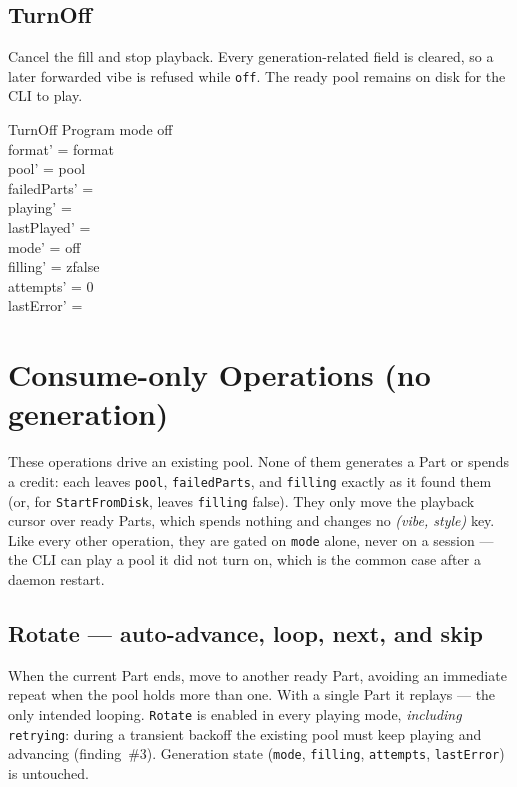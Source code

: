 \documentclass[a4paper,10pt,fleqn]{article}
\begin{document}
\subsection{TurnOff}

Cancel the fill and stop playback. Every generation-related field is cleared,
so a later forwarded vibe is refused while \texttt{off}. The ready pool remains
on disk for the CLI to play.

\begin{schema}{TurnOff}
  \Delta Program
  \where
  mode \neq off \\
  format' = format \\
  pool' = pool \\
  failedParts' = \emptyset \\
  playing' = \emptyset \\
  lastPlayed' = \emptyset \\
  mode' = off \\
  filling' = zfalse \\
  attempts' = 0 \\
  lastError' = \emptyset
\end{schema}

\section{Consume-only Operations (no generation)}

These operations drive an existing pool. None of them generates a Part or
spends a credit: each leaves \texttt{pool}, \texttt{failedParts}, and
\texttt{filling} exactly as it found them (or, for \texttt{StartFromDisk},
leaves \texttt{filling} false). They only move the playback cursor over ready
Parts, which spends nothing and changes no \emph{(vibe, style)} key. Like every
other operation, they are gated on \texttt{mode} alone, never on a session ---
the CLI can play a pool it did not turn on, which is the common case after a
daemon restart.

\subsection{Rotate --- auto-advance, loop, next, and skip}

When the current Part ends, move to another ready Part, avoiding an immediate
repeat when the pool holds more than one. With a single Part it replays --- the
only intended looping. \texttt{Rotate} is enabled in every playing mode,
\emph{including} \texttt{retrying}: during a transient backoff the existing pool
must keep playing and advancing (finding~\#3). Generation state
(\texttt{mode}, \texttt{filling}, \texttt{attempts}, \texttt{lastError}) is
untouched.
\end{document}
